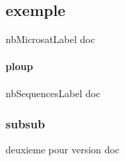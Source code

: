 \documentclass[12pt,a4paper]{article}
\begin{document}
        \subsection{exemple}
        \label{doc_nbMicrosatLabel}
        nbMicrosatLabel doc
            \paragraph{ploup}
            \label{doc_nbSequencesLabel}
            nbSequencesLabel doc

            \subsubsection{subsub}
            \label{doc_versionLabel+++plip}
            deuxieme pour version doc
\end{document}
